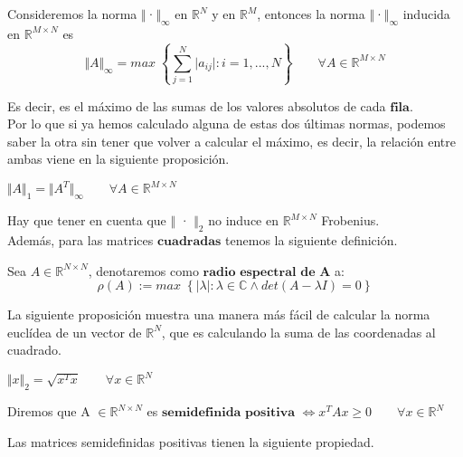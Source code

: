 \begin{nprop}
Consideremos la norma $\Vert$·$\Vert _\infty$ en $\mathbb{R}^N$ y en $\mathbb{R}^M$, entonces la norma $\Vert$·$\Vert _\infty$ inducida en $\mathbb{R}^{M \times N}$ es
\[ \Vert A \Vert _\infty = max \; \left\lbrace \sum_{j=1}^N \vert a_{ij} \vert : i = 1,...,N \right\rbrace \qquad \forall A \in \mathbb{R}^{M \times N} \]
\end{nprop}

Es decir, es el máximo de las sumas de los valores absolutos de cada $\textbf{fila}$.\\

Por lo que si ya hemos calculado alguna de estas dos últimas normas, podemos saber la otra sin tener que volver a calcular el máximo, es decir, la relación entre ambas viene en la siguiente proposición.

\begin{nprop}
$\Vert A \Vert _1 = \Vert A^T \Vert _\infty \qquad \forall A \in \mathbb{R}^{M \times N}$
\end{nprop}

Hay que tener en cuenta que $\Vert$ · $\Vert _2$ no induce en $\mathbb{R}^{M \times N}$ Frobenius.\\

Además, para las matrices $\textbf{cuadradas}$ tenemos la siguiente definición.

\begin{ndef}
Sea $A \in \mathbb{R}^{N \times N}$, denotaremos como $\textbf{radio espectral de A}$ a:
\[ \rho (A) := max \; \left\lbrace \vert \lambda \vert : \lambda \in \mathbb{C} \wedge det(A - \lambda I) = 0 \right\rbrace \]
\end{ndef}

La siguiente proposición muestra una manera más fácil de calcular la norma euclídea de un vector de $\mathbb{R}^N$, que es calculando la suma de las coordenadas al cuadrado.

\begin{nprop}
$\Vert x \Vert _2 = \sqrt{x^Tx} \qquad \forall x \in \mathbb{R}^N$
\end{nprop}

\begin{ndef}
Diremos que A $\in \mathbb{R}^{N \times N}$ es $\textbf{semidefinida positiva}$ $ \Leftrightarrow x^TAx \geq 0 \qquad \forall x \in \mathbb{R}^N $
\end{ndef}

Las matrices semidefinidas positivas tienen la siguiente propiedad.


